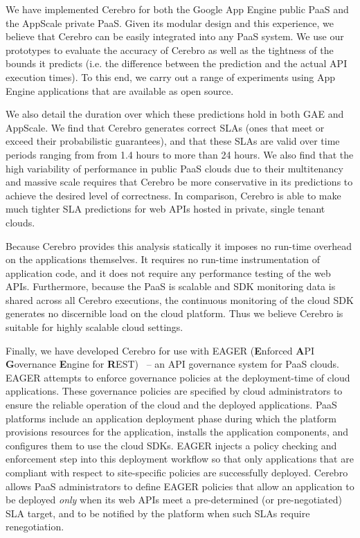 We have implemented Cerebro for both the Google App Engine public PaaS and 
the AppScale private PaaS. Given its modular design and this experience, 
we believe that Cerebro can be easily integrated into any PaaS system.
We use our prototypes to evaluate the accuracy of Cerebro 
as well as the tightness
of the bounds it predicts (i.e. the difference between the prediction and 
the actual API execution times). To this end, we carry out a range of experiments
 using App Engine applications that are available as open source.  

We also detail the duration over which 
these predictions hold in both GAE and AppScale.  
We find that Cerebro generates correct SLAs (ones that meet or exceed their
probabilistic guarantees), and that these SLAs are valid over time periods ranging from
from 1.4 hours to more than 24 hours.  
We also find that the high variability of performance in public PaaS clouds due to their multitenancy
and massive scale requires that Cerebro be more conservative in its predictions 
to achieve the desired level of correctness. In comparison, Cerebro is able to make
much tighter SLA predictions for web APIs hosted in private, single tenant clouds.

Because Cerebro provides this 
analysis statically it imposes no run-time overhead on the applications
themselves. It requires no run-time instrumentation of application code,
and it does not require any performance testing of the web APIs.
Furthermore, because the PaaS is scalable and SDK monitoring data is 
shared across all Cerebro executions, the continuous monitoring of the
cloud SDK generates no discernible load on the cloud platform.
Thus we believe Cerebro is suitable for highly scalable cloud
settings.

Finally, we have developed Cerebro for use with EAGER (\textbf{E}nforced
\textbf{A}PI \textbf{G}overnance \textbf{E}ngine for
\textbf{R}EST)~\cite{eager-fop15} --
an API governance system for PaaS clouds. EAGER attempts to enforce
governance policies at the deployment-time of cloud applications. These governance
policies are specified by cloud administrators to ensure the reliable
operation of the cloud and the deployed applications. PaaS
platforms include an application deployment phase during which the platform provisions
resources for the application, installs the application components, and
configures them to use the cloud SDKs. EAGER injects a policy checking and
enforcement step into this deployment workflow so that only applications that
are compliant with respect to site-specific policies are successfully deployed. 
Cerebro allows
PaaS administrators to define
EAGER policies that allow an application to be deployed \textit{only} when its
web APIs meet a pre-determined (or pre-negotiated) SLA target, and to be
notified by the platform when such SLAs require renegotiation.

